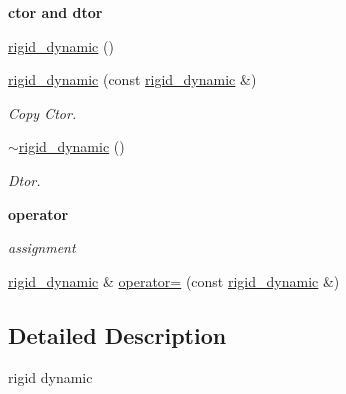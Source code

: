 \begin{Indent}{\bf ctor and dtor}\par
{\em \label{_amgrp98fbd3e5ae66fcd014fb744fec76c58d}
 }\begin{DoxyCompactItemize}
\item 
\hyperlink{classnebula_1_1content_1_1actor_1_1physics_1_1physx_1_1rigid__dynamic_a9151e9410d8e186bbb66a92359171948}{rigid\_\-dynamic} ()
\item 
\hyperlink{classnebula_1_1content_1_1actor_1_1physics_1_1physx_1_1rigid__dynamic_aab8a53455825d47da2806655dd09e9bb}{rigid\_\-dynamic} (const \hyperlink{classnebula_1_1content_1_1actor_1_1physics_1_1physx_1_1rigid__dynamic}{rigid\_\-dynamic} \&)
\begin{DoxyCompactList}\small\item\em Copy Ctor. \item\end{DoxyCompactList}\item 
\hyperlink{classnebula_1_1content_1_1actor_1_1physics_1_1physx_1_1rigid__dynamic_a8ab4544497b4f2f83eda57d105d2a8cb}{$\sim$rigid\_\-dynamic} ()
\begin{DoxyCompactList}\small\item\em Dtor. \item\end{DoxyCompactList}\end{DoxyCompactItemize}
\end{Indent}
\begin{Indent}{\bf operator}\par
{\em \label{_amgrp4b583376b2767b923c3e1da60d10de59}
 assignment }\begin{DoxyCompactItemize}
\item 
\hyperlink{classnebula_1_1content_1_1actor_1_1physics_1_1physx_1_1rigid__dynamic}{rigid\_\-dynamic} \& \hyperlink{classnebula_1_1content_1_1actor_1_1physics_1_1physx_1_1rigid__dynamic_a956e5d0fadb4b75aa03e99991c84c445}{operator=} (const \hyperlink{classnebula_1_1content_1_1actor_1_1physics_1_1physx_1_1rigid__dynamic}{rigid\_\-dynamic} \&)
\end{DoxyCompactItemize}
\end{Indent}


\subsection{Detailed Description}
rigid dynamic 

